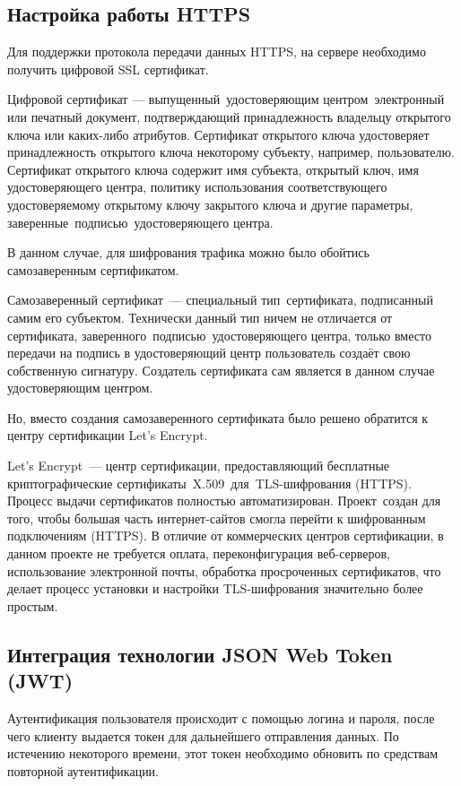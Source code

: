 \clearpage
\subsection{Настройка работы HTTPS}
Для поддержки протокола передачи данных HTTPS, на сервере необходимо получить цифровой SSL сертификат.

Цифровой сертификат --- выпущенный удостоверяющим центром электронный или печатный документ, подтверждающий принадлежность владельцу открытого ключа или каких-либо атрибутов. Сертификат открытого ключа удостоверяет принадлежность открытого ключа некоторому субъекту, например, пользователю. Сертификат открытого ключа содержит имя субъекта, открытый ключ, имя удостоверяющего центра, политику использования соответствующего удостоверяемому открытому ключу закрытого ключа и другие параметры, заверенные подписью удостоверяющего центра.

В данном случае, для шифрования трафика можно было обойтись самозаверенным сертификатом.

Самозаверенный сертификат --- специальный тип сертификата, подписанный самим его субъектом. Технически данный тип ничем не отличается от сертификата, заверенного подписью удостоверяющего центра, только вместо передачи на подпись в удостоверяющий центр пользователь создаёт свою собственную сигнатуру. Создатель сертификата сам является в данном случае удостоверяющим центром.

Но, вместо создания самозаверенного сертификата было решено обратится к центру сертификации Let’s Encrypt.

Let’s Encrypt --- центр сертификации, предоставляющий бесплатные криптографические сертификаты X.509 для TLS-шифрования (HTTPS). Процесс выдачи сертификатов полностью автоматизирован. Проект создан для того, чтобы большая часть интернет-сайтов смогла перейти к шифрованным подключениям (HTTPS). В отличие от коммерческих центров сертификации, в данном проекте не требуется оплата, переконфигурация веб-серверов, использование электронной почты, обработка просроченных сертификатов, что делает процесс установки и настройки TLS-шифрования значительно более простым.


\clearpage
\subsection{Интеграция технологии JSON Web Token (JWT)}
Аутентификация пользователя происходит с помощью логина и пароля, после чего клиенту выдается токен для дальнейшего отправления данных. По истечению некоторого времени, этот токен необходимо обновить по средствам повторной аутентификации.

